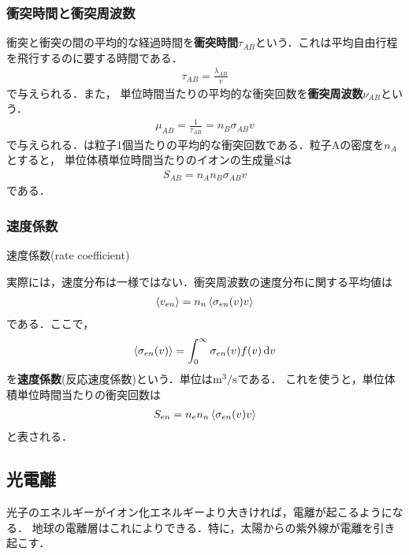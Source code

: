 \documentclass{report}
\begin{document}
      \subsubsection{衝突時間と衝突周波数}
        衝突と衝突の間の平均的な経過時間を\textbf{衝突時間}$\tau_{AB}$という．これは平均自由行程を飛行するのに要する時間である．
        \begin{align}
          \tau_{AB} = \frac{\lambda_{AB}}{v} \label{eq:collision_time}
        \end{align}
        で与えられる．また，
        単位時間当たりの平均的な衝突回数を\textbf{衝突周波数}$\nu_{AB}$という．
        \begin{align}
          \mu_{AB} = \frac{1}{\tau_{AB}} = n_B \sigma_{AB} v \label{eq:collision_frequency}
        \end{align}
        で与えられる．は粒子1個当たりの平均的な衝突回数である．粒子Aの密度を$n_A$とすると，
        単位体積単位時間当たりのイオンの生成量$S$は
        \begin{align}
          S_{AB} = n_A n_B \sigma_{AB} v
        \end{align}
        である．

      \subsubsection{速度係数}
        速度係数(rate coefficient)

        実際には，速度分布は一様ではない．衝突周波数の速度分布に関する平均値は
        \begin{align}
          \ev{v_{en}} = n_n \ev{\sigma_{en}(v)v}
        \end{align}
        である．ここで，
        \begin{align}
          \ev{\sigma_{en}(v)} = \int_0^{\infty} \sigma_{en}(v)f(v)\dd{v}
        \end{align}
        を\textbf{速度係数}(反応速度係数)という．単位は$\mathrm{m^3/s}$である．
        これを使うと，単位体積単位時間当たりの衝突回数は
        \begin{align}
          S_{en} = n_e n_n \ev{\sigma_{en}(v)v}
        \end{align}
        と表される．
    \subsection{光電離}
      光子のエネルギーがイオン化エネルギーより大きければ，電離が起こるようになる．
      地球の電離層はこれによりできる．特に，太陽からの紫外線が電離を引き起こす．
\end{document}

